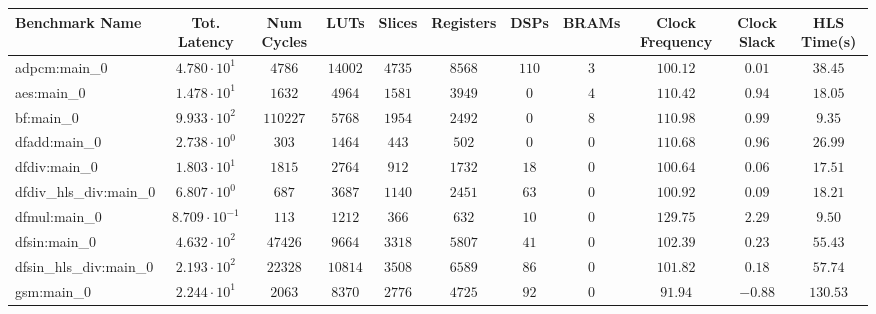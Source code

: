 \begin{tabular}{|l|c|c|c|c|c|c|c|c|c|c|}
\hline
Benchmark Name          & Tot. Latency            & Num Cycles & LUTs      & Slices    & Registers & DSPs    & BRAMs  & Clock Frequency & Clock Slack & HLS Time(s) \\
\hline
adpcm:main\_0           & $ 4.780 \cdot 10^{1}  $ & $ 4786   $ & $ 14002 $ & $ 4735  $ & $ 8568  $ & $ 110 $ & $ 3  $ & $ 100.12      $ & $ 0.01    $ & $ 38.45   $ \\
aes:main\_0             & $ 1.478 \cdot 10^{1}  $ & $ 1632   $ & $ 4964  $ & $ 1581  $ & $ 3949  $ & $ 0   $ & $ 4  $ & $ 110.42      $ & $ 0.94    $ & $ 18.05   $ \\
bf:main\_0              & $ 9.933 \cdot 10^{2}  $ & $ 110227 $ & $ 5768  $ & $ 1954  $ & $ 2492  $ & $ 0   $ & $ 8  $ & $ 110.98      $ & $ 0.99    $ & $ 9.35    $ \\
dfadd:main\_0           & $ 2.738 \cdot 10^{0}  $ & $ 303    $ & $ 1464  $ & $ 443   $ & $ 502   $ & $ 0   $ & $ 0  $ & $ 110.68      $ & $ 0.96    $ & $ 26.99   $ \\
dfdiv:main\_0           & $ 1.803 \cdot 10^{1}  $ & $ 1815   $ & $ 2764  $ & $ 912   $ & $ 1732  $ & $ 18  $ & $ 0  $ & $ 100.64      $ & $ 0.06    $ & $ 17.51   $ \\
dfdiv\_hls\_div:main\_0 & $ 6.807 \cdot 10^{0}  $ & $ 687    $ & $ 3687  $ & $ 1140  $ & $ 2451  $ & $ 63  $ & $ 0  $ & $ 100.92      $ & $ 0.09    $ & $ 18.21   $ \\
dfmul:main\_0           & $ 8.709 \cdot 10^{-1} $ & $ 113    $ & $ 1212  $ & $ 366   $ & $ 632   $ & $ 10  $ & $ 0  $ & $ 129.75      $ & $ 2.29    $ & $ 9.50    $ \\
dfsin:main\_0           & $ 4.632 \cdot 10^{2}  $ & $ 47426  $ & $ 9664  $ & $ 3318  $ & $ 5807  $ & $ 41  $ & $ 0  $ & $ 102.39      $ & $ 0.23    $ & $ 55.43   $ \\
dfsin\_hls\_div:main\_0 & $ 2.193 \cdot 10^{2}  $ & $ 22328  $ & $ 10814 $ & $ 3508  $ & $ 6589  $ & $ 86  $ & $ 0  $ & $ 101.82      $ & $ 0.18    $ & $ 57.74   $ \\
gsm:main\_0             & $ 2.244 \cdot 10^{1}  $ & $ 2063   $ & $ 8370  $ & $ 2776  $ & $ 4725  $ & $ 92  $ & $ 0  $ & $ 91.94       $ & $ -0.88   $ & $ 130.53  $ \\

\end{tabular}

